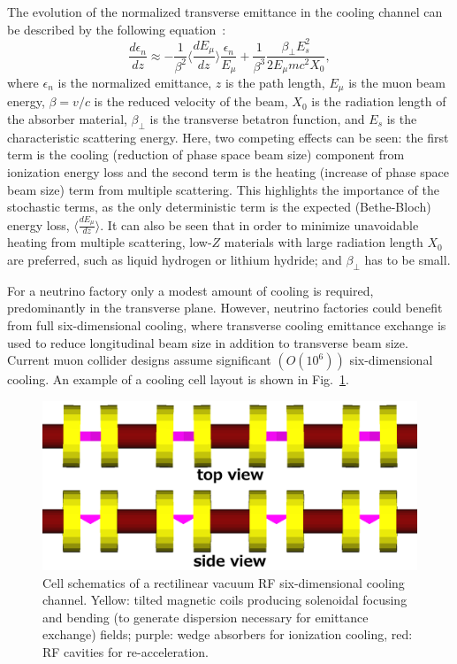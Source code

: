\documentclass[a4paper,11pt]{article}
\begin{document}
The evolution of the normalized transverse emittance in the cooling channel can be 
described by the following equation~\cite{neuffer}:
\begin{equation}
\frac{d\epsilon_{n}}{dz} \approx -\frac{1}{\beta^{2}}
\langle\frac{dE_{\mu}}{dz}\rangle \frac{\epsilon_{n}}{E_{\mu}}+\frac{1}{\beta^{3}}\frac{\beta_{\perp}E_{s}^{2}}{2E_{\mu}mc^{2}X_{0}},
\label{eq:cooling}
\end{equation}
where $\epsilon_{n}$ is the normalized emittance, $z$ is the path length, $E_{\mu}$ is the muon beam energy, $\beta=v/c$ is the reduced velocity of the beam, $X_{0}$ is the radiation length of the absorber material, $\beta_{\perp}$ is the transverse betatron function, and $E_s$ is the characteristic scattering energy. Here, two competing effects can be seen: the first term is the cooling (reduction of phase space beam size) component from ionization energy loss and the second term is the heating (increase of phase space beam size) term from multiple scattering. This highlights the importance of the stochastic terms, as the only deterministic term is the expected (Bethe-Bloch) energy loss, $\langle\frac{dE_{\mu}}{dz}\rangle$. It can also be seen that in order to minimize unavoidable heating from multiple scattering, low-$Z$ materials with large radiation length $X_0$ are preferred, such as liquid hydrogen or lithium hydride; and $\beta_\perp$ has to be small.
\fi







For a neutrino factory only a modest amount of cooling is required, predominantly in the transverse plane. However, neutrino factories could benefit from full six-dimensional cooling, where transverse cooling emittance exchange is used to reduce longitudinal beam size in addition to transverse beam size. Current muon collider designs assume significant $\left(O(10^6)\right)$ six-dimensional cooling. An example of a cooling cell layout is shown in Fig.~\ref{fig:vcc}.

\begin{figure}[htb] 
\centering
\includegraphics[width=\columnwidth]{vcc}
\caption{Cell schematics of a rectilinear vacuum RF six-dimensional cooling channel. Yellow: tilted magnetic coils producing solenoidal focusing and bending (to generate dispersion necessary for emittance exchange) fields; purple: wedge absorbers for ionization cooling, red: RF cavities for re-acceleration.}
\label{fig:vcc}
\end{figure}
\end{document}
